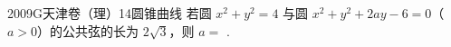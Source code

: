 
\begin{problem}{2009}{G}{天津卷（理）}{14}{圆锥曲线}
若圆 $x^2+y^2=4$ 与圆 $x^2+y^2+2ay-6=0$（$a>0$）的公共弦的长为 $2\sqrt{3}$，则 $a=$ \underline{\hspace{4em}}.
\end{problem}

\begin{answer}

\end{answer}

\begin{solutions}

\end{solutions}
